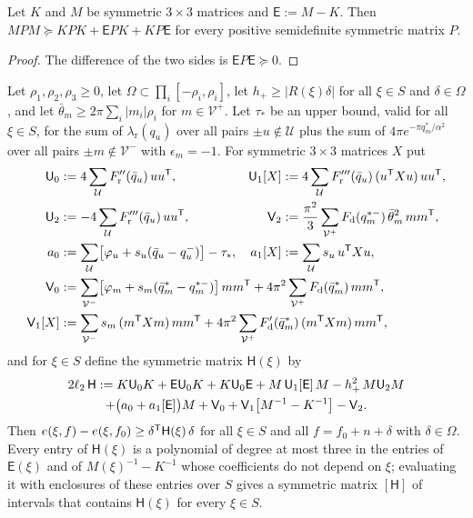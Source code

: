 \begin{lemma}\label{lem:det-transport}
Let $K$ and $M$ be symmetric $3\times3$ matrices and $\mathsf E:=M-K$. Then $MPM\succeq KPK+\mathsf EPK+KP\mathsf E$ for every
positive semidefinite symmetric matrix $P$.
\end{lemma}

\begin{proof}
The difference of the two sides is $\mathsf EP\mathsf E\succeq0$.
\end{proof}

\begin{lemma}\label{lem:det-H}
Let $\rho_1,\rho_2,\rho_3\ge0$, let $\Omega\subset\prod_i[-\rho_i,\rho_i]$, let $h_+\ge|R(\xi)\delta|$ for all $\xi\in S$ and
$\delta\in\Omega$, and let
$\bar\theta_m\ge2\pi\sum_i|m_i|\rho_i$ for $m\in\mathcal V^+$. Let $\tau_*$ be an upper bound, valid for all $\xi\in S$, for the sum
of $\lambda_{\mathrm r}(q_u)$ over all pairs $\pm u\notin\mathcal U$ plus the sum of $4\pi e^{-\pi q_m^*/\alpha^2}$ over all pairs
$\pm m\notin\mathcal V^-$ with $\epsilon_m=-1$. For symmetric $3\times3$ matrices $X$ put
\begin{align*}
  \mathsf U_0&:=4\sum_{\mathcal U}F_{\mathrm r}''(\bar q_u)\,uu^\T, &
  \mathsf U_1[X]&:=4\sum_{\mathcal U}F_{\mathrm r}'''(\bar q_u)\,(u^\T Xu)\,uu^\T, \\
  \mathsf U_2&:=-4\sum_{\mathcal U}F_{\mathrm r}'''(\bar q_u)\,uu^\T, &
  \mathsf V_2&:=\frac{\pi^2}3\sum_{\mathcal V^+}F_{\mathrm d}(q_m^{*-})\,\bar\theta_m^2\,mm^\T,\\
  a_0&:=\sum_{\mathcal U}\bigl[\varphi_u+s_u(\bar q_u-q_u^-)\bigr]-\tau_*, & a_1[X]&:=\sum_{\mathcal U}s_u\,u^\T Xu,\\
  \mathsf V_0&:=\rlap{$\displaystyle\sum_{\mathcal V^-}\bigl[\varphi_m+s_m(\bar q_m^*-q_m^{*-})\bigr]\,mm^\T+4\pi^2\sum_{\mathcal V^+}F_{\mathrm d}(\bar q_m^*)\,mm^\T,$}\\
  \mathsf V_1[X]&:=\rlap{$\displaystyle\sum_{\mathcal V^-}s_m\,(m^\T Xm)\,mm^\T+4\pi^2\sum_{\mathcal V^+}F_{\mathrm d}'(\bar q_m^*)\,(m^\T Xm)\,mm^\T ,$}
\end{align*}
and for $\xi\in S$ define the symmetric matrix $\mathsf H(\xi)$ by
\begin{multline}\label{eq:det-H}
  2\ell_2\,\mathsf H:=K\mathsf U_0K+\mathsf E\mathsf U_0K+K\mathsf U_0\mathsf E+M\,\mathsf U_1[\mathsf E]\,M-h_+^2\,M\mathsf U_2M\\
    +\bigl(a_0+a_1[\mathsf E]\bigr)M+\mathsf V_0+\mathsf V_1\bigl[M^{-1}-K^{-1}\bigr]-\mathsf V_2 .
\end{multline}
Then $e(\xi,f)-e(\xi,f_0)\ge\delta^\mathsf T\mathsf H(\xi)\,\delta$ for all $\xi\in S$ and all $f=f_0+n+\delta$ with $\delta\in\Omega$.
Every entry of $\mathsf H(\xi)$ is a polynomial of degree at most three in the entries of $\mathsf E(\xi)$ and of
$M(\xi)^{-1}-K^{-1}$ whose coefficients do not depend on $\xi$; evaluating it with enclosures of these entries over $S$ gives a
symmetric matrix $[\mathsf H]$ of intervals that contains $\mathsf H(\xi)$ for every $\xi\in S$.
\end{lemma}

